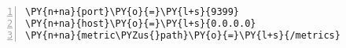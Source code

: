 \begin{Verbatim}[commandchars=\\\{\},numbers=left,firstnumber=1,stepnumber=1,frame=single]
\PY{n+na}{port}\PY{o}{=}\PY{l+s}{9399}
\PY{n+na}{host}\PY{o}{=}\PY{l+s}{0.0.0.0}
\PY{n+na}{metric\PYZus{}path}\PY{o}{=}\PY{l+s}{/metrics}
\end{Verbatim}

